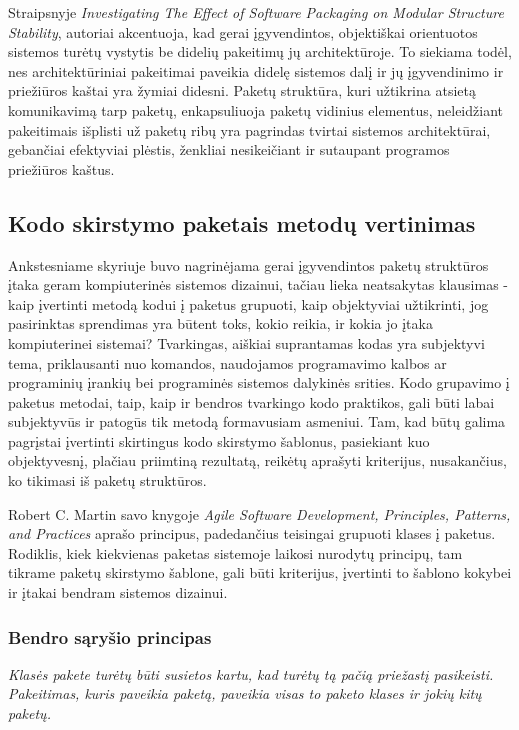 Straipsnyje \textit{Investigating The Effect of Software Packaging on Modular Structure Stability}, autoriai akcentuoja, kad
gerai įgyvendintos, objektiškai orientuotos sistemos turėtų vystytis be didelių pakeitimų jų architektūroje.
To siekiama todėl, nes architektūriniai pakeitimai paveikia didelę sistemos dalį ir
jų įgyvendinimo ir priežiūros kaštai yra žymiai didesni\cite{ModularStability}.
Paketų struktūra, kuri užtikrina atsietą  komunikavimą tarp paketų, enkapsuliuoja paketų vidinius elementus, neleidžiant pakeitimais
išplisti už paketų ribų yra pagrindas tvirtai sistemos architektūrai, gebančiai efektyviai plėstis, ženkliai nesikeičiant ir sutaupant programos priežiūros kaštus.

\subsection{Kodo skirstymo paketais metodų vertinimas}
Ankstesniame skyriuje buvo nagrinėjama gerai įgyvendintos paketų struktūros įtaka geram kompiuterinės sistemos dizainui,
tačiau lieka neatsakytas klausimas - kaip įvertinti metodą kodui į paketus grupuoti, kaip objektyviai užtikrinti,
jog pasirinktas sprendimas yra būtent toks, kokio reikia, ir kokia jo įtaka kompiuterinei sistemai?
Tvarkingas, aiškiai suprantamas kodas yra subjektyvi tema, priklausanti nuo komandos,
naudojamos programavimo kalbos ar programinių įrankių bei programinės sistemos dalykinės srities.
Kodo grupavimo į paketus metodai, taip, kaip ir bendros tvarkingo kodo praktikos,
gali būti labai subjektyvūs ir patogūs tik metodą formavusiam asmeniui.
Tam, kad būtų galima pagrįstai įvertinti skirtingus kodo skirstymo šablonus, pasiekiant kuo objektyvesnį,
plačiau priimtiną rezultatą, reikėtų aprašyti kriterijus, nusakančius, ko tikimasi iš paketų struktūros.

Robert C. Martin savo knygoje \textit{Agile Software Development, Principles, Patterns, and Practices} aprašo
principus, padedančius teisingai grupuoti klases į paketus.
Rodiklis, kiek kiekvienas paketas sistemoje laikosi nurodytų principų, tam tikrame paketų skirstymo šablone, gali
būti kriterijus, įvertinti to šablono kokybei ir įtakai bendram sistemos dizainui.

\subsubsection{Bendro sąryšio principas}
\textit{Klasės pakete turėtų būti susietos kartu, kad turėtų tą pačią priežastį pasikeisti. Pakeitimas,
kuris paveikia paketą, paveikia visas to paketo klases ir jokių kitų paketų.}

